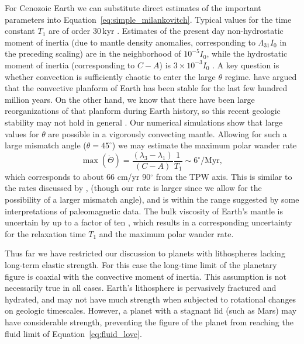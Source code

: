 \documentclass[preprint,12pt,authoryear]{elsarticle}
\begin{document}
For Cenozoic Earth we can substitute direct estimates of the important parameters into Equation~\eqref{eq:simple_milankovitch}.
Typical values for the time constant $T_1$ are of order $30 \, \mathrm{kyr}$ \citep{ricard1993polar}.
Estimates of the present day non-hydrostatic moment of inertia (due to mantle density anomalies, corresponding to $\Lambda_{31}I_0$ in the preceding scaling)
are in the neighborhood of $10^{-5} I_0$, while the hydrostatic moment of inertia (corresponding to $C-A$) is $3 \times 10^{-3} I_0$ \citep{chambat2001mean}.
A key question is whether convection is sufficiently chaotic to enter the large $\theta$ regime. 
\citet{richards1997explanation} have argued that the convective planform of Earth has been stable for the last
few hundred million years. On the other hand, we know that there have been large reorganizations of that planform 
during Earth history, so this recent geologic stability may not hold in general \citep{evans2003true}.
Our numerical simulations show that large values for $\theta$ are possible in a vigorously convecting mantle.
Allowing for such a large mismatch angle ($\theta = 45^\circ$) we may estimate the maximum polar wander rate
\begin{equation}
\max ( \dot{\Theta} ) = \frac{(\lambda_3-\lambda_1)}{(C-A)}\frac{1}{T_1} \sim 6^\circ / \mathrm{Myr},
\end{equation}
which corresponds to about 66 cm/yr 90$^\circ$ from the TPW axis.
This is similar to the rates discussed by \citet{cambiotti2011new}, (though our rate is larger since we allow for the
possibility of a larger mismatch angle), and is within the range suggested by some interpretations of paleomagnetic data.
The bulk viscosity of Earth's mantle is uncertain by up to a factor of ten \citep{mitrovica2004new},
which results in a corresponding uncertainty for the relaxation time $T_1$ and the maximum polar wander rate.

Thus far we have restricted our discussion to planets with lithospheres lacking long-term elastic strength.
For this case the long-time limit of the planetary figure is coaxial with the convective 
moment of inertia. This assumption is not necessarily true in all cases.
Earth's lithosphere is pervasively fractured and hydrated, and may not have much strength when subjected to rotational changes on geologic timescales.
However, a planet with a stagnant lid (such as Mars) may have considerable strength, preventing the figure of the planet 
from reaching the fluid limit of Equation~\eqref{eq:fluid_love}.
\end{document}

